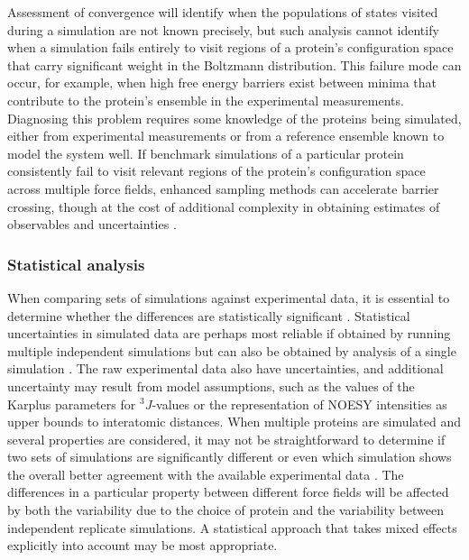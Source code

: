 \documentclass[9pt,review,pubversion]{livecoms}
\begin{document}
Assessment of convergence will identify when the populations of states visited during a simulation are not known precisely, but such analysis cannot identify when a simulation fails entirely to visit regions of a protein's configuration space that carry significant weight in the Boltzmann distribution.
This failure mode can occur, for example, when high free energy barriers exist between minima that contribute to the protein's ensemble in the experimental measurements.
Diagnosing this problem requires some knowledge of the proteins being simulated, either from experimental measurements or from a reference ensemble known to model the system well.
If benchmark simulations of a particular protein consistently fail to visit relevant regions of the protein's configuration space across multiple force fields, enhanced sampling methods \cite{henin_enhanced_2022} can accelerate barrier crossing, though at the cost of additional complexity in obtaining estimates of observables and uncertainties \cite{grossfield_best_2019}.

\subsubsection{Statistical analysis}
\label{sub2:statistics}

When comparing sets of simulations against experimental data, it is essential to determine whether the differences are statistically significant \cite{van_gunsteren_validation_2018}.
Statistical uncertainties in simulated data are perhaps most reliable if obtained by running multiple independent simulations but can also be obtained by analysis of a single simulation \cite{grossfield_best_2019}.
The raw experimental data also have uncertainties, and additional uncertainty may result from model assumptions, such as the values of the Karplus parameters for $^3J$-values or the representation of NOESY intensities as upper bounds to interatomic distances.
When multiple proteins are simulated and several properties are considered, it may not be straightforward to determine if two sets of simulations are significantly different or even which simulation shows the overall better agreement with the available experimental data \cite{wassenaar_effect_2006,villa_how_2007,stroet_validation_2024}.
The differences in a particular property between different force fields will be affected by both the variability due to the choice of protein and the variability between independent replicate simulations.
A statistical approach that takes mixed effects explicitly into account \cite{stroet_validation_2024} may be most appropriate.
\end{document}
